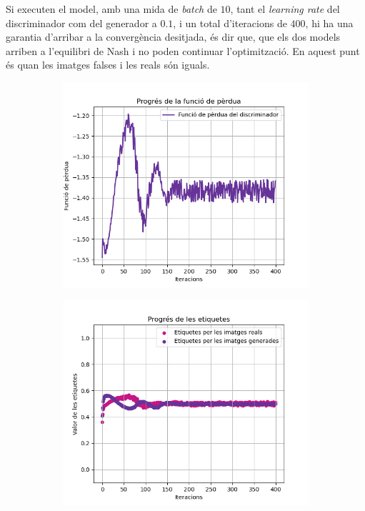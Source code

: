 Si executen el model, amb una mida de \textit{batch} de $10$, tant el \textit{learning rate} del discriminador com del generador a $0.1$, i un total d'iteracions de $400$, hi ha una garantia d'arribar a la convergència desitjada, és dir que, que els dos models arriben a l'equilibri de Nash i no poden continuar l'optimització. En aquest punt és quan les imatges falses i les reals són iguals.
\begin{figure}[H]
	\label{fig:labels_loss_400}
	\begin{subfigure}{0.5\textwidth}
		\includegraphics[width=\linewidth]{figures/model/loss_plot.png}
		\caption{}
		\label{fig:loss_400}
	\end{subfigure}
	\begin{subfigure}{0.5\textwidth}
		\includegraphics[width=\linewidth]{figures/model/labels_plot.png}

\end{subfigure}
\end{figure}
